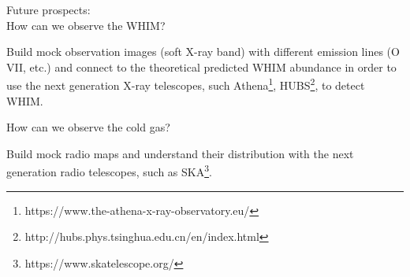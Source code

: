 \documentclass[aspectratio=169]{beamer}
\begin{document}
\begin{frame}[plain,c]
  \begin{center}
      {\huge Future prospects: \\ How can we observe the WHIM?}
      
      Build mock observation images (soft X-ray band) with different emission lines (O VII, etc.) and connect to the theoretical predicted WHIM abundance in order to use the next generation X-ray telescopes, such Athena\footnote{https://www.the-athena-x-ray-observatory.eu/}, HUBS\footnote{http://hubs.phys.tsinghua.edu.cn/en/index.html}, to detect WHIM.
      
      \bigskip
      
      \bigskip
      
      {\huge How can we observe the cold gas?}
      
      Build mock radio maps and understand their distribution with the next generation radio telescopes, such as SKA\footnote{https://www.skatelescope.org/}.
  \end{center}
    

\end{frame}
\end{document}
